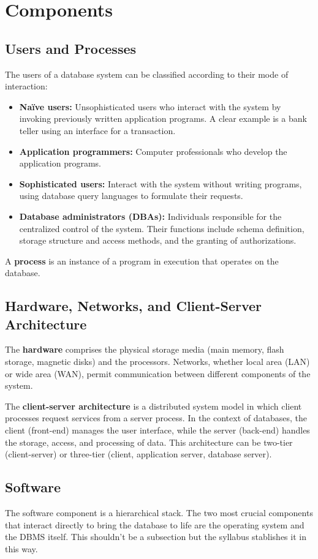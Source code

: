 \section{Components}

\subsection{Users and Processes}
The users of a database system can be classified according to their mode of interaction:
\begin{itemize}
    \item \textbf{Naïve users:} Unsophisticated users who interact with the system by invoking previously written application programs. A clear example is a bank teller using an interface for a transaction.
    \item \textbf{Application programmers:} Computer professionals who develop the application programs.
    \item \textbf{Sophisticated users:} Interact with the system without writing programs, using database query languages to formulate their requests.
    \item \textbf{Database administrators (DBAs):} Individuals responsible for the centralized control of the system. Their functions include schema definition, storage structure and access methods, and the granting of authorizations.
\end{itemize}
A \textbf{process} is an instance of a program in execution that operates on the database.

\subsection{Hardware, Networks, and Client-Server Architecture}
The \textbf{hardware} comprises the physical storage media (main memory, flash storage, magnetic disks) and the processors. Networks, whether local area (LAN) or wide area (WAN), permit communication between different components of the system.

The \textbf{client-server architecture} is a distributed system model in which client processes request services from a server process. In the context of databases, the client (front-end) manages the user interface, while the server (back-end) handles the storage, access, and processing of data. This architecture can be two-tier (client-server) or three-tier (client, application server, database server).

\subsection{Software}
The software component is a hierarchical stack. The two most crucial components that interact directly to bring the database to life are the operating system and the DBMS itself. This shouldn't be a subsection but the syllabus stablishes it in this way.

